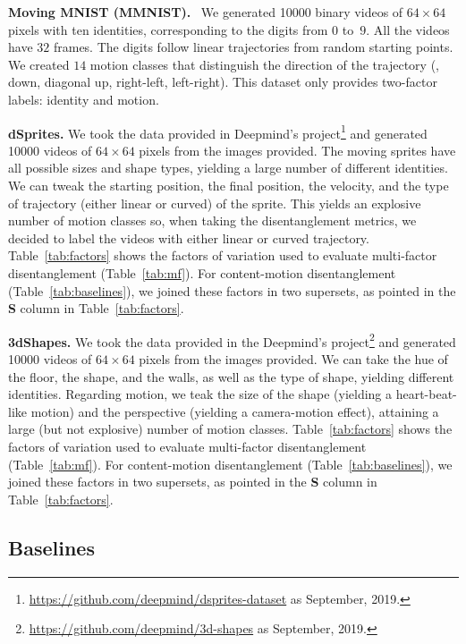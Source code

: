 \textbf{Moving MNIST (MMNIST).}~\cite{Srivastava2015}
We generated \num{10000} binary videos of $64\times 64$ pixels with ten identities, corresponding to the digits from $0$ to~$9$.
All the videos have $32$ frames.
The digits follow linear trajectories from random starting points. 
We created $14$ motion classes that distinguish the direction of the trajectory (\eg, down, diagonal up, right-left, left-right).
This dataset only provides two-factor labels: identity and motion.

\textbf{dSprites.}
We took the data provided in Deepmind's project\footnote{\url{https://github.com/deepmind/dsprites-dataset} as September, 2019.} and generated \num{10000} videos of $64\times 64$ pixels from the images provided.
The moving sprites have all possible sizes and shape types, yielding a large number of different identities. 
We can tweak the starting position, the final position, the velocity, and the type of trajectory (either linear or curved) of the sprite.
This yields an explosive number of motion classes so, when taking the disentanglement metrics, we decided to label the videos with either linear or curved trajectory.
Table~\ref{tab:factors} shows the factors of variation used to evaluate multi-factor disentanglement (Table~\ref{tab:mf}).
For content-motion disentanglement (Table~\ref{tab:baselines}), we joined these factors in two supersets, as pointed in the \textbf{S} column in Table~\ref{tab:factors}.

\textbf{3dShapes.}
We took the data provided in the Deepmind's project\footnote{\url{https://github.com/deepmind/3d-shapes} as  September, 2019.} and generated \num{10000} videos of $64\times 64$ pixels from the images provided.
We can take the hue of the floor, the shape, and the walls, as well as the type of shape, yielding different identities.
Regarding motion, we teak the size of the shape (yielding a heart-beat-like motion) and the perspective (yielding a camera-motion effect), attaining a large (but not explosive) number of motion classes.
Table~\ref{tab:factors} shows the factors of variation used to evaluate multi-factor disentanglement (Table~\ref{tab:mf}).
For content-motion disentanglement (Table~\ref{tab:baselines}), we joined these factors in two supersets, as pointed in the \textbf{S} column in Table~\ref{tab:factors}.

\subsection{Baselines}

